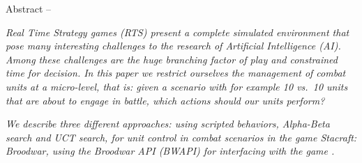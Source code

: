 \begin{bfseries} Abstract -- \end{bfseries}
\emph{
Real Time Strategy games (RTS) present a complete simulated environment that pose many interesting challenges to the research of Artificial Intelligence (AI).
Among these challenges are the huge branching factor of play and constrained time for decision.
In this paper we restrict ourselves the management of combat units at a micro-level, that is: given a scenario with for example 10 vs.\ 10 units that are about to engage in battle, which actions should our units perform?
}

\emph{
We describe three different approaches: using scripted behaviors, Alpha-Beta search and UCT search, for unit control in combat scenarios in the game Stacraft: Broodwar, using the Broodwar API (BWAPI) for interfacing with the game \cite{BWAPI}.
}
